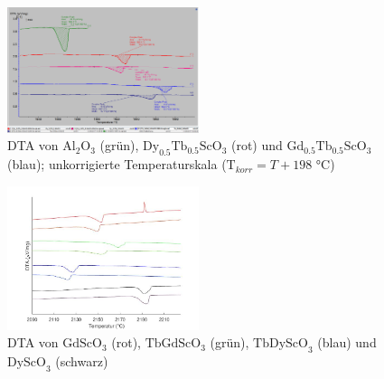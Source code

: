 \documentclass[aps,twocolumn,secnumarabic,nobalancelastpage,amsmath,amssymb,
nofootinbib,superscriptaddress]{revtex4-1}
\begin{document}

\begin{figure}
  \centering
  \includegraphics[width=0.5\textwidth]{../img/Messungen_ComplexPeaks.png}
  \caption{\label{fig:dtaDyTb+TbGd_Gross} DTA von $\text{Al}_{2}\text{O}_3$ (grün), $\text{Dy}_{0.5}\text{Tb}_{0.5}\text{ScO}_3$ (rot)
  und $\text{Gd}_{0.5}\text{Tb}_{0.5}\text{ScO}_3$ (blau); unkorrigierte Temperaturskala ($\text{T}_{korr}=T + 198\text{ °C}$)}
\end{figure}

\begin{figure}
  \centering
   \includegraphics[width=0.5\textwidth]{../img/vglSkandate.jpg}
  \caption{\label{fig:dtaAllGross} DTA von $\text{GdScO}_3$ (rot), $\text{TbGdScO}_3$ (grün), $\text{TbDyScO}_3$ (blau) und $\text{DyScO}_3$ (schwarz)}
\end{figure}

\newpage


\end{document}
